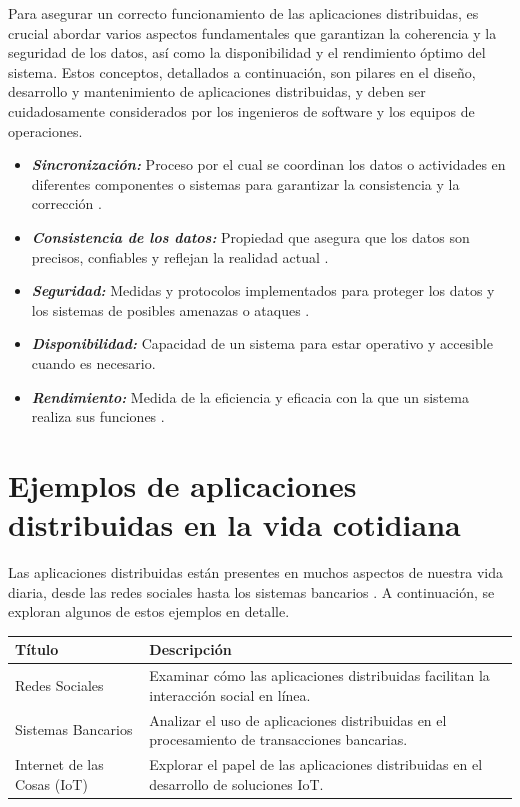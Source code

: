 Para asegurar un correcto funcionamiento de las aplicaciones distribuidas, es crucial abordar varios aspectos fundamentales que garantizan la coherencia y la seguridad de los datos, así como la disponibilidad y el rendimiento óptimo del sistema. Estos conceptos, detallados a continuación, son pilares en el diseño, desarrollo y mantenimiento de aplicaciones distribuidas, y deben ser cuidadosamente considerados por los ingenieros de software y los equipos de operaciones.

\begin{itemize}
	\item \textbf{\textit{Sincronización: }}Proceso por el cual se coordinan los datos o actividades en diferentes componentes o sistemas para garantizar la consistencia y la corrección \cite{Francisco2021,Kumar2023}.
	\item \textbf{\textit{Consistencia de los datos: }}Propiedad que asegura que los datos son precisos, confiables y reflejan la realidad actual \cite{Sushant2023,Shivani2023,Baorong2023}.
	\item \textbf{\textit{Seguridad: }}Medidas y protocolos implementados para proteger los datos y los sistemas de posibles amenazas o ataques \cite{Alaba2024smart,Kumar2023,Shivani2023}.
	\item \textbf{\textit{Disponibilidad: }}Capacidad de un sistema para estar operativo y accesible cuando es necesario.
	\item \textbf{\textit{Rendimiento: }}Medida de la eficiencia y eficacia con la que un sistema realiza sus funciones \cite{Wang2017127,Kumar2023,Baorong2023}.
\end{itemize}

\section{Ejemplos de aplicaciones distribuidas en la vida cotidiana}
\noindent
Las aplicaciones distribuidas están presentes en muchos aspectos de nuestra vida diaria, desde las redes sociales hasta los sistemas bancarios \cite{You2023multi}. A continuación, se exploran algunos de estos ejemplos en detalle.

\noindent
\begin{tabular}{|l|p{10cm}|}
	\hline
	Título & Descripción \\
	\hline
	Redes Sociales & Examinar cómo las aplicaciones distribuidas facilitan la interacción social en línea. \\
	\hline
	Sistemas Bancarios & Analizar el uso de aplicaciones distribuidas en el procesamiento de transacciones bancarias. \\
	\hline
	Internet de las Cosas (IoT) & Explorar el papel de las aplicaciones distribuidas en el desarrollo de soluciones IoT. \\
	\hline
\end{tabular}

